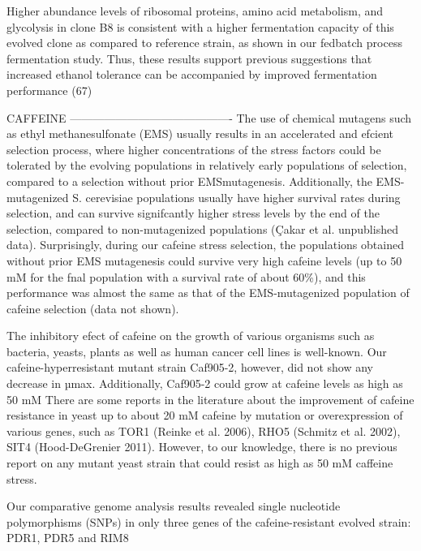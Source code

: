 Higher abundance levels of ribosomal proteins, amino acid metabolism, and glycolysis in clone B8 is consistent with a higher fermentation capacity of this evolved clone as compared to reference strain, as shown in our fedbatch process fermentation study. Thus, these results support previous suggestions that increased ethanol tolerance can be accompanied by improved fermentation performance (67)


CAFFEINE
-------------------------------------------
The use of chemical mutagens such as ethyl methanesulfonate (EMS) usually results in an accelerated and efcient selection process, where higher concentrations of the stress factors could be tolerated by the evolving populations in relatively early populations of selection, compared to a selection without prior EMSmutagenesis. Additionally, the EMS-mutagenized S. cerevisiae populations usually have higher survival rates during selection, and can survive signifcantly higher stress levels by the end of the selection, compared to non-mutagenized populations (Çakar et al. unpublished data). Surprisingly, during our cafeine stress selection, the populations obtained without prior EMS mutagenesis could survive very high cafeine levels (up to 50 mM for the fnal population with a survival rate of about 60\%), and this performance was almost the same as that of the EMS-mutagenized population of cafeine selection (data not shown).

The inhibitory efect of cafeine on the growth of various organisms such as bacteria, yeasts, plants as well as human cancer cell lines is well-known. Our cafeine-hyperresistant mutant strain Caf905-2, however, did not show any decrease in µmax. Additionally, Caf905-2 could grow at cafeine levels as high as 50 mM There are some reports in the literature about the improvement of cafeine resistance in yeast up to about 20 mM cafeine by mutation or overexpression of various genes, such as TOR1 (Reinke et al. 2006), RHO5 (Schmitz et al. 2002), SIT4 (Hood-DeGrenier 2011). However, to our knowledge, there is no previous report on any mutant yeast strain that could resist as high as 50 mM caffeine stress.

Our comparative genome analysis results revealed single nucleotide polymorphisms (SNPs) in only three genes of the cafeine-resistant evolved strain: PDR1, PDR5 and RIM8

